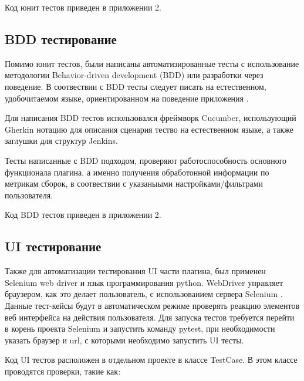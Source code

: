 Код юнит тестов приведен в приложении 2.

\subsection{BDD тестирование}

Помимо юнит тестов, были написаны автоматизированные тесты с использование методологии Behavior-driven development (BDD) или разработки через поведение. В соотвествии с BDD тесты следует писать на естественном, удобочитаемом языке, ориентированном на поведение приложения \cite{bdd}.

Для написания BDD тестов использовался фреймворк Cucumber, использующий Gherkin нотацию для описания сценария тество на естественном языке, а также заглушки для структур Jenkins.

Тесты написанные с BDD подходом, проверяют работоспособность основного функционала плагина, а именно получения обработонной информации по метрикам сборок, в соотвествии с указаныыми настройками/фильтрами пользователя.

Код BDD тестов приведен в приложении 2.

\subsection{UI тестирование}

Также для автоматизации тестирования UI части плагина, был применен Selenium web driver и язык программирования python. WebDriver управляет браузером, как это делает пользователь, с использованием сервера Selenium \cite{webdriver}. Данные тест-кейсы будут в автоматическом режиме проверять реакцию элементов веб интерфейса на действия пользователя. Для запуска тестов требуется перейти в корень проекта Selenium и запустить команду pytest, при необходимости указать браузер и url, с которыми необходимо запустить UI тесты.

Код UI тестов расположен в отдельном проекте в классе TestCase. В этом классе проводятся проверки, такие как:

